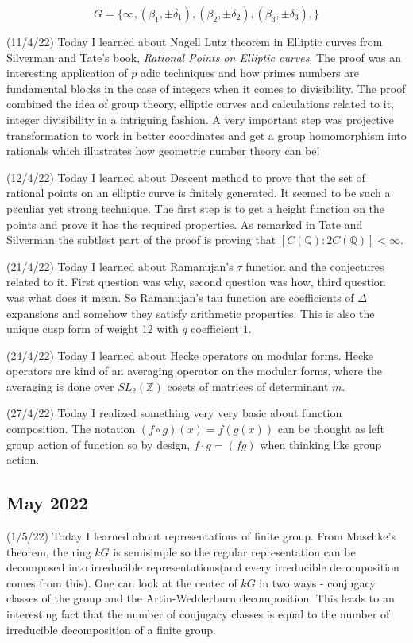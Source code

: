 \documentclass[12pt,a4paper]{article}
\newcommand{\Z}{\mathbb{Z}}
\newcommand{\Q}{\mathbb{Q}}
\begin{document}
   \[ G  =\{\infty, (\beta_1,\pm \delta_1),(\beta_2,\pm \delta_2),(\beta_3,\pm \delta_3),\} \]
   
(11/4/22) Today I learned about Nagell Lutz theorem in Elliptic curves from Silverman and Tate's book, \textit{Rational Points on Elliptic curves}. The proof was an interesting application of $p$ adic techniques and how primes numbers are fundamental blocks in the case of integers when it comes to divisibility. The proof combined the idea of group theory, elliptic curves and calculations related to it, integer divisibility in a intriguing fashion. A very important step was projective transformation to work in better coordinates and get a group homomorphism into rationals which illustrates how geometric number theory can be! 
   
(12/4/22) Today I learned about Descent method to prove that the set of rational points on an elliptic curve is finitely generated. It seemed to be such a peculiar yet strong technique. The first step is to get a height function on the points and prove it has the required properties. As remarked in Tate and Silverman the subtlest part of the proof is proving that $[C(\Q): 2C(\Q)] < \infty $.
	
(21/4/22) Today I learned about Ramanujan's $\tau$ function and the conjectures related to it. First question was why, second question was how, third question was what does it mean. So Ramanujan's tau function are coefficients of $\Delta$ expansions and somehow they satisfy arithmetic properties. This is also the unique cusp form of weight 12 with $q$ coefficient $1$.
	
(24/4/22) Today I learned about Hecke operators on modular forms. Hecke operators are kind of an averaging operator on the modular forms, where the averaging is done over $SL_2(\Z)$ cosets of matrices of determinant $m$. 
	
(27/4/22) Today I realized something very very basic about function composition. The notation $(f \circ g)(x) =f(g(x))$ can be thought as left group action of function so by design, $f \cdot g = (fg)$ when thinking like group action. 
	
\subsection*{May 2022}
	
	
\quad (1/5/22) Today I learned about representations of finite group. From Maschke's theorem, the ring $kG$ is semisimple so the regular representation can be decomposed into irreducible representations(and every irreducible decomposition comes from this). %
One can look at the center of $kG$ in two ways - conjugacy classes of the group and the Artin-Wedderburn decomposition. This leads to an interesting fact that the number of conjugacy classes is equal to the number of irreducible decomposition of a finite group.
	
\end{document}
